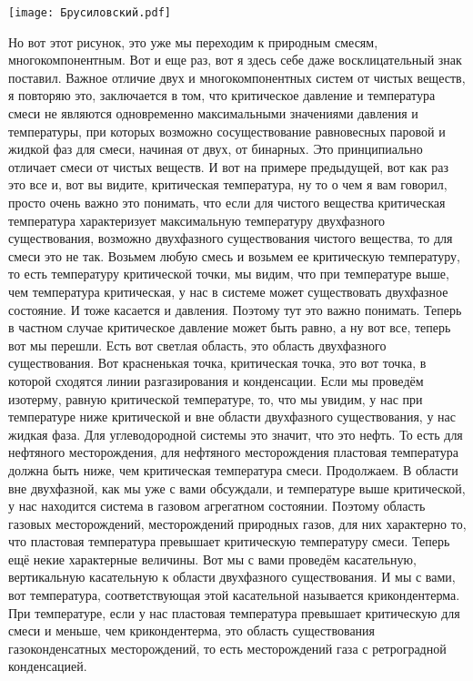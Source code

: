 \documentclass[main.tex]{subfiles}
\begin{document}
\begin{center}
\texttt{[image: Брусиловский.pdf]}
\end{center}

Но вот этот рисунок, это уже мы переходим к природным смесям, многокомпонентным.
Вот и еще раз, вот я здесь себе даже восклицательный знак поставил.
Важное отличие двух и многокомпонентных систем от чистых веществ, я повторяю это, заключается в том, что критическое давление и температура смеси не являются одновременно максимальными значениями давления и температуры, при которых возможно сосуществование равновесных паровой и жидкой фаз для смеси, начиная от двух, от бинарных.
Это принципиально отличает смеси от чистых веществ.
И вот на примере предыдущей, вот как раз это все и, вот вы видите, критическая температура, ну то о чем я вам говорил, просто очень важно это понимать, что если для чистого вещества критическая температура
характеризует максимальную температуру двухфазного существования, возможно двухфазного существования чистого вещества, то для смеси это не так.
Возьмем любую смесь и возьмем ее критическую температуру, то есть температуру критической точки, мы видим, что при температуре выше, чем температура критическая, у нас в системе может существовать двухфазное состояние.
И тоже касается и давления.
Поэтому тут это важно понимать.
Теперь в частном случае критическое давление может быть равно, а ну вот все, теперь вот мы перешли.
Есть вот светлая область, это область двухфазного существования.
Вот красненькая точка, критическая точка, это вот точка, в которой сходятся линии разгазирования и конденсации.
Если мы проведём изотерму, равную критической температуре, то, что мы увидим, у нас при температуре ниже критической и вне области двухфазного существования, у нас жидкая фаза.
Для углеводородной системы это значит, что это нефть.
То есть для нефтяного месторождения, для нефтяного месторождения пластовая температура должна быть ниже, чем критическая температура смеси.
Продолжаем.
В области вне двухфазной, как мы уже с вами обсуждали, и температуре выше критической, у нас находится система в газовом агрегатном состоянии.
Поэтому область газовых месторождений, месторождений природных газов, для них характерно то, что пластовая температура превышает критическую температуру смеси.
Теперь ещё некие характерные величины.
Вот мы с вами проведём касательную, вертикальную касательную к области двухфазного существования.
И мы с вами, вот температура, соответствующая этой касательной называется крикондентерма.
При температуре, если у нас пластовая температура превышает критическую для смеси и меньше, чем крикондентерма, это область существования газоконденсатных месторождений, то есть месторождений газа с ретроградной конденсацией.
\end{document}
